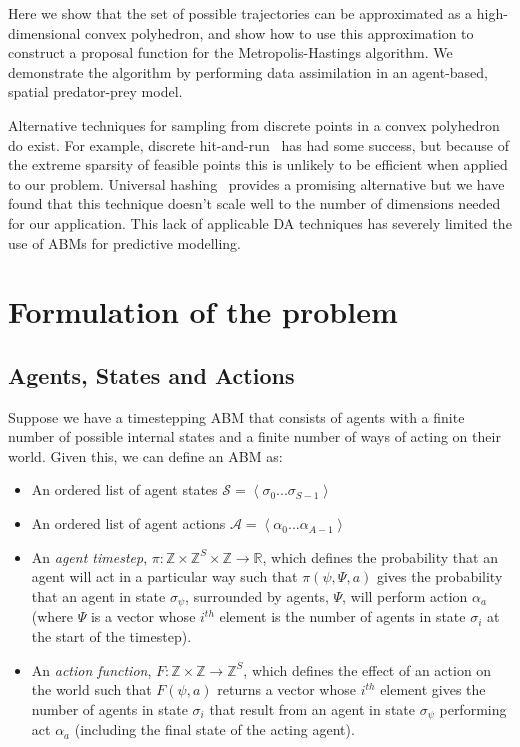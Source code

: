 \documentclass{article}
\begin{document}
Here we show that the set of possible trajectories can be approximated as a high-dimensional convex polyhedron, and show how to use this approximation to construct a proposal function for the Metropolis-Hastings algorithm. We demonstrate the algorithm by performing data assimilation in an agent-based, spatial predator-prey model.

Alternative techniques for sampling from discrete points in a convex polyhedron do exist. For example, discrete hit-and-run~\cite{baumert2009discrete} has had some success, but because of the extreme sparsity of feasible points this is unlikely to be efficient when applied to our problem. Universal hashing~\cite{meel2016constrained} provides a promising alternative but we have found that this technique doesn't scale well to the number of dimensions needed for our application. This lack of applicable DA techniques has severely limited the use of ABMs for predictive modelling.

\section{Formulation of the problem}

\subsection{Agents, States and Actions}
\label{abmdef}
Suppose we have a timestepping ABM that consists of agents with a finite number of possible internal states and a finite number of ways of acting on their world. Given this, we can define an ABM as:
\begin{itemize}
	\item An ordered list of agent states $\mathcal{S} = \left<\sigma_0 ... \sigma_{S-1}\right>$

	\item An ordered list of agent actions $\mathcal{A} =\left< \alpha_0 ... \alpha_{A-1} \right>$	
	
	\item An \textit{agent timestep}, $\pi : \mathbb{Z}\times\mathbb{Z}^S\times\mathbb{Z} \to \mathbb{R}$, which defines the probability that an agent will act in a particular way such that $\pi(\psi,\Psi,a)$ gives the probability that an agent in state $\sigma_\psi$, surrounded by agents, $\Psi$, will perform action $\alpha_a$ (where $\Psi$ is a vector whose $i^{th}$ element is the number of agents in state $\sigma_i$ at the start of the timestep).
	
	\item An \textit{action function}, $F: \mathbb{Z} \times \mathbb{Z} \to \mathbb{Z}^S$, which defines the effect of an action on the world such that $F(\psi, a)$ returns a vector whose $i^{th}$ element gives the number of agents in state $\sigma_i$ that result from an agent in state $\sigma_\psi$ performing act $\alpha_a$ (including the final state of the acting agent).
\end{itemize}
\end{document}
